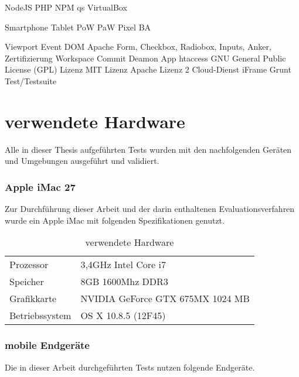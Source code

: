 		\Gls{NodeJS}
		\Gls{PHP}
		\Gls{NPM}
		\Gls{qs}
		\Gls{VirtualBox}
		
		\Gls{Smartphone}
		\Gls{Tablet}
		\Gls{PoW}
		\Gls{PaW}
		\Gls{Pixel}
		\Gls{BA}
		
		\Gls{Viewport}
		\Gls{Event}
		\Gls{DOM}
		\Gls{Apache}
		\Gls{Form, Checkbox, Radiobox, Inputs, Anker, Zertifizierung}
		\Gls{Workspace}
		\Gls{Commit}
		\Gls{Deamon}
		\Gls{App}
		\Gls{htaccess}
		\Gls{GNU General Public License (GPL) Lizenz}
		\Gls{MIT Lizenz}
		\Gls{Apache Lizenz 2}
		\Gls{Cloud-Dienst}
		\Gls{iFrame}
		\Gls{Grunt}
		\Gls{Test/Testsuite}
	
	\pagebreak
	\section{verwendete Hardware}
	Alle in dieser Thesis aufgeführten Tests wurden mit den nachfolgenden Geräten und Umgebungen ausgeführt und validiert.
	
	\subsubsection{Apple iMac 27\texttt\dq}
	Zur Durchführung dieser Arbeit und der darin enthaltenen Evaluationsverfahren wurde ein Apple iMac mit folgenden 				Spezifikationen genutzt.
	
	\begin{table}[H]
	 \vspace{-20pt}
 		\centering
			\begin{tabular}{| p{4cm} | p{8cm}  |}
			\hline
				Prozessor			&	3,4GHz Intel Core i7 \\
				Speicher			&	8GB 1600Mhz DDR3\\
				Grafikkarte		&	NVIDIA GeForce GTX 675MX 1024 MB\\
				Betriebssystem		&	OS X 10.8.5 (12F45)\\

				\hline
				\end{tabular}
			\caption{verwendete Hardware}
	\end{table}

	\subsubsection{mobile Endgeräte}
	Die in dieser Arbeit durchgeführten Tests nutzen folgende Endgeräte. 
	
	
